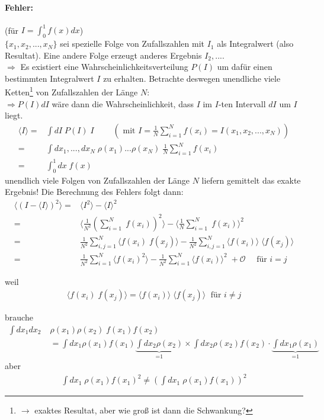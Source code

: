 \documentclass[12pt]{article}
\begin{document}
\paragraph{Fehler:} (für $I = \int_0^1 f(x) dx$)\\
$\{ x_1, x_2,..., x_N\}$ sei spezielle Folge von Zufallszahlen mit $I_1$ als Integralwert (also Resultat). Eine andere Folge erzeugt anderes Ergebnis $I_2,...$. \\
$\Rightarrow$ Es existiert eine Wahrscheinlichkeitsverteilung $P(I)$ um dafür einen bestimmten Integralwert $I$ zu erhalten.   %
Betrachte deswegen unendliche viele Ketten\footnote{$\to$ exaktes Resultat, aber wie groß ist dann die Schwankung?} von Zufallszahlen der Länge $N$:\\
$\Rightarrow P(I) dI$ wäre dann die Wahrscheinlichkeit, dass $I$ im $I$-ten Intervall $dI$ um $I$ liegt.
\begin{align}
\langle I \rangle =& \int dI \; P(I) \; I \; \quad \quad \left( \mbox{ mit } I= \frac{1}{N} \sum_{i=1}^N f(x_i)= I(x_1,x_2,...,x_N) \right) \\
=& \int dx_1,...,dx_N \; \rho(x_1) ... \rho(x_N) \; \frac{1}{N} \sum_{i=1}^N f(x_i) \\
=& \int_0^1 dx \; f(x) 
\end{align}
unendlich viele Folgen von Zufallszahlen der Länge $N$ liefern gemittelt das exakte Ergebnis! Die Berechnung des Fehlers folgt dann:
\begin{align}
\langle (I- \langle I \rangle)^2 \rangle =& \langle I^2 \rangle - \langle I \rangle ^2 \\
=& \langle \frac{1}{N^2} \left( \sum_{i=1}^N \; f(x_i) \right) ^2 \rangle - \langle \frac{1}{N} \sum_{i=1}^N \; f(x_i)\rangle^2 \\
=& \frac{1}{N^2} \sum_{i,j=1}^N \langle f(x_i) \; f(x_j) \rangle - \frac{1}{N^2} \sum_{i,j=1}^N \langle f(x_i) \rangle \; \langle f(x_j) \rangle \\
=& \frac{1}{N^2} \sum_{i=1}^N \langle f(x_i)^2 \rangle - \frac{1}{N^2} \sum_{i=1}^N \langle f(x_i) \rangle ^2 \; +\mathcal{O} \quad \mbox{ für } i = j
\end{align}

weil
\begin{align*}
\langle f(x_i) \; f(x_j) \rangle = \langle f(x_i) \rangle \; \langle f(x_j) \rangle \; \mbox{ für } i \neq j
\end{align*}

brauche
\begin{align}
\int dx_1 dx_2 \; & \rho(x_1) \rho(x_2) \; f(x_1) f(x_2) \\
&= \int dx_1 \rho(x_1)f(x_1)  \underbrace{\int dx_2 \rho(x_2)}_\text{=1}\times  \int dx_2 \rho(x_2)f(x_2) \cdot \underbrace{\int dx_1 \rho(x_1)}_\text{=1} 
\end{align} 
aber
\begin{align*}
\int dx_1 \; \rho (x_1) f(x_1)^2 \neq \left( \int dx_1 \; \rho (x_1) f(x_1) \right) ^2
\end{align*}
\end{document}
